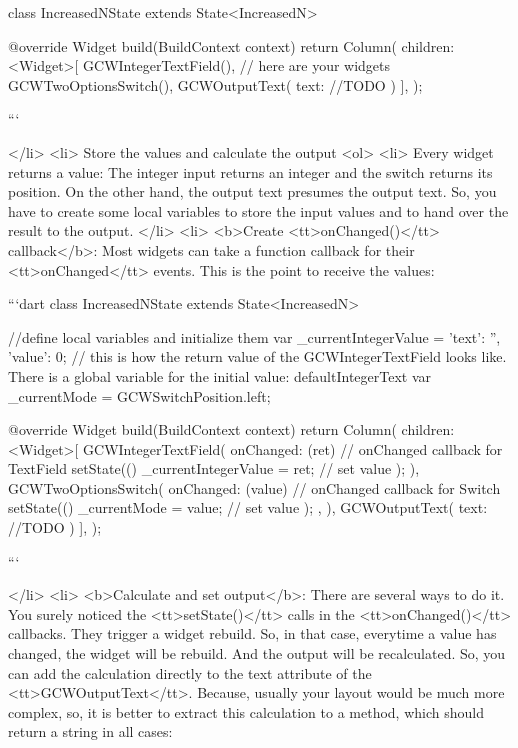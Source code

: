 class IncreasedNState extends State<IncreasedN> {

  @override
  Widget build(BuildContext context) {
    return Column(
      children: <Widget>[
        GCWIntegerTextField(),  // here are your widgets
        GCWTwoOptionsSwitch(),
        GCWOutputText(
          text: //TODO
        )
      ],
    );
  }
}
```
    
</li>
	<li>
		Store the values and calculate the output
		<ol>
			<li>
				Every widget returns a value: The integer input returns an integer and the switch returns its position. On the other hand, the output text presumes the output text. So, you have to create some local variables to store the input values and to hand over the result to the output.
			</li>
			<li>
				<b>Create <tt>onChanged()</tt> callback</b>: Most widgets can take a function callback for their <tt>onChanged</tt> events. This is the point to receive the values:
				
```dart
class IncreasedNState extends State<IncreasedN> {

  //define local variables and initialize them
  var _currentIntegerValue = {'text': '', 'value': 0}; // this is how the return value of the GCWIntegerTextField looks like. There is a global variable for the initial value: defaultIntegerText
  var _currentMode = GCWSwitchPosition.left;

  @override
  Widget build(BuildContext context) {
    return Column(
      children: <Widget>[
        GCWIntegerTextField(
          onChanged: (ret) {              // onChanged callback for TextField
            setState(() {
              _currentIntegerValue = ret; // set value
            });
          }
        ),
        GCWTwoOptionsSwitch(
          onChanged: (value) {            // onChanged callback for Switch
            setState(() {
              _currentMode = value;       // set value
            });
          },
        ),
        GCWOutputText(
          text: //TODO
        )
      ],
    );
  }
}
```
        
</li>
			<li>
				<b>Calculate and set output</b>: There are several ways to do it. You surely noticed the <tt>setState()</tt> calls in the <tt>onChanged()</tt> callbacks. They trigger a widget rebuild. So, in that case, everytime a value has changed, the widget will be rebuild. And the output will be recalculated. So, you can add the calculation directly to the text attribute of the <tt>GCWOutputText</tt>. Because, usually your layout would be much more complex, so, it is better to extract this calculation to a method, which should return a string in all cases:

